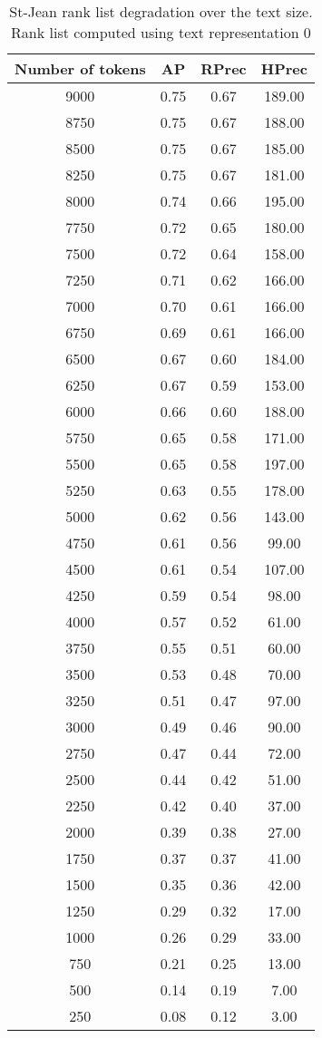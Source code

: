 \begin{table}[H]
  \centering
  \caption{St-Jean rank list degradation over the text size. Rank list computed using text representation 0}
  \label{tab:degradation}

  \begin{tabular}{c|c c c}
    \toprule
    Number of tokens & AP & RPrec & HPrec \\
    \midrule
    9000 & 0.75 & 0.67 & 189.00 \\
    8750 & 0.75 & 0.67 & 188.00 \\
    8500 & 0.75 & 0.67 & 185.00 \\
    8250 & 0.75 & 0.67 & 181.00 \\
    8000 & 0.74 & 0.66 & 195.00 \\
    7750 & 0.72 & 0.65 & 180.00 \\
    7500 & 0.72 & 0.64 & 158.00 \\
    7250 & 0.71 & 0.62 & 166.00 \\
    7000 & 0.70 & 0.61 & 166.00 \\
    6750 & 0.69 & 0.61 & 166.00 \\
    6500 & 0.67 & 0.60 & 184.00 \\
    6250 & 0.67 & 0.59 & 153.00 \\
    6000 & 0.66 & 0.60 & 188.00 \\
    5750 & 0.65 & 0.58 & 171.00 \\
    5500 & 0.65 & 0.58 & 197.00 \\
    5250 & 0.63 & 0.55 & 178.00 \\
    5000 & 0.62 & 0.56 & 143.00 \\
    4750 & 0.61 & 0.56 &  99.00 \\
    4500 & 0.61 & 0.54 & 107.00 \\
    4250 & 0.59 & 0.54 &  98.00 \\
    4000 & 0.57 & 0.52 &  61.00 \\
    3750 & 0.55 & 0.51 &  60.00 \\
    3500 & 0.53 & 0.48 &  70.00 \\
    3250 & 0.51 & 0.47 &  97.00 \\
    3000 & 0.49 & 0.46 &  90.00 \\
    2750 & 0.47 & 0.44 &  72.00 \\
    2500 & 0.44 & 0.42 &  51.00 \\
    2250 & 0.42 & 0.40 &  37.00 \\
    2000 & 0.39 & 0.38 &  27.00 \\
    1750 & 0.37 & 0.37 &  41.00 \\
    1500 & 0.35 & 0.36 &  42.00 \\
    1250 & 0.29 & 0.32 &  17.00 \\
    1000 & 0.26 & 0.29 &  33.00 \\
    750 & 0.21 & 0.25 &  13.00 \\
    500 & 0.14 & 0.19 &   7.00 \\
    250 & 0.08 & 0.12 &   3.00 \\
    \bottomrule
  \end{tabular}
\end{table}

